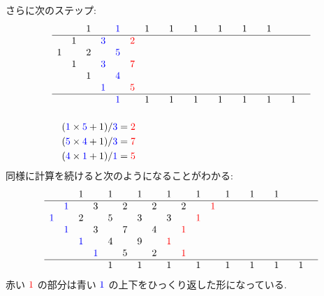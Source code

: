 \documentclass[12pt,twoside,dvipdfm]{jarticle}
\newcommand\red{\color{red}}
\newcommand\blue{\color{blue}}
\renewcommand\r{\red}
\renewcommand\b{\blue}
\theoremstyle{definition} %
\theoremstyle{definition} %
\theoremstyle{definition} %
\numberwithin{theorem}{section}
\numberwithin{equation}{section}
\numberwithin{figure}{section}
\numberwithin{table}{section}
\begin{document}
さらに次のステップ:
\begin{align*}
&
\begin{array}{cccccccccccccccccccc}
    &   & 1 &   &\b1&   & 1 &   & 1 &   & 1 &   & 1 &   & 1 &   & 1 &   &   &   \\ \hline
    & 1 &   &\b3&   &\r2&   &   &   &   &   &   &   &   &   &   &   &   &   &   \\
  1 &   & 2 &   &\b5&   &   &   &   &   &   &   &   &   &   &   &   &   &   &   \\
    & 1 &   &\b3&   &\r7&   &   &   &   &   &   &   &   &   &   &   &   &   &   \\
    &   & 1 &   &\b4&   &   &   &   &   &   &   &   &   &   &   &   &   &   &   \\
    &   &   &\b1&   &\r5&   &   &   &   &   &   &   &   &   &   &   &   &   &   \\ \hline
    &   &   &   &\b1&   & 1 &   & 1 &   & 1 &   & 1 &   & 1 &   & 1 &   & 1 &   \\
\end{array}
\\[\bigskipamount] & \quad
({\b1}\times{\b5}+1)/{\b3}={\r2}
\\ & \quad
({\b5}\times{\b4}+1)/{\b3}={\r7}
\\ & \quad
({\b4}\times{\b1}+1)/{\b1}={\r5}
\end{align*} 
同様に計算を続けると次のようになることがわかる:
\begin{equation*}
\begin{array}{cccccccccccccccccccc}
    &   & 1 &   & 1 &   & 1 &   & 1 &   & 1 &   & 1 &   & 1 &   & 1 &   &   &   \\ \hline
    &\b1&   & 3 &   & 2 &   & 2 &   & 2 &   &\r1&   &   &   &   &   &   &   &   \\
 \b1&   & 2 &   & 5 &   & 3 &   & 3 &   &\r1&   &   &   &   &   &   &   &   &   \\
    &\b1&   & 3 &   & 7 &   & 4 &   &\r1&   &   &   &   &   &   &   &   &   &   \\
    &   &\b1&   & 4 &   & 9 &   &\r1&   &   &   &   &   &   &   &   &   &   &   \\
    &   &   &\b1&   & 5 &   & 2 &   &\r1&   &   &   &   &   &   &   &   &   &   \\ \hline
    &   &   &   & 1 &   & 1 &   & 1 &   & 1 &   & 1 &   & 1 &   & 1 &   & 1 &   \\
\end{array}
\end{equation*}
赤い $\r1$ の部分は青い $\b1$ の上下をひっくり返した形になっている. \\
\end{document}
